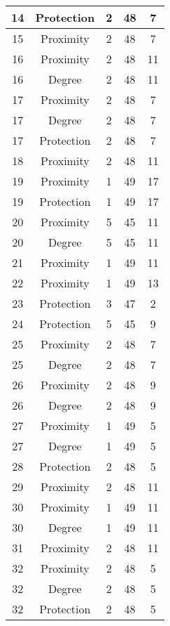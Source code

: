 \documentclass[results.tex]{subfiles}
\begin{document}
\begin{center}
\begin{tabular}{| c || c | c | c | c |}
    \hline
    14 & Protection & 2 & 48 & 7 \\ 
    \hline
    15 & Proximity & 2 & 48 & 7 \\ 
    \hline
    16 & Proximity & 2 & 48 & 11 \\ 
    \hline
    16 & Degree & 2 & 48 & 11 \\ 
    \hline
    17 & Proximity & 2 & 48 & 7 \\ 
    \hline
    17 & Degree & 2 & 48 & 7 \\ 
    \hline
    17 & Protection & 2 & 48 & 7 \\ 
    \hline
    18 & Proximity & 2 & 48 & 11 \\ 
    \hline
    19 & Proximity & 1 & 49 & 17 \\ 
    \hline
    19 & Protection & 1 & 49 & 17 \\ 
    \hline
    20 & Proximity & 5 & 45 & 11 \\ 
    \hline
    20 & Degree & 5 & 45 & 11 \\ 
    \hline
    21 & Proximity & 1 & 49 & 11 \\ 
    \hline
    22 & Proximity & 1 & 49 & 13 \\ 
    \hline
    23 & Protection & 3 & 47 & 2 \\ 
    \hline
    24 & Protection & 5 & 45 & 9 \\ 
    \hline
    25 & Proximity & 2 & 48 & 7 \\ 
    \hline
    25 & Degree & 2 & 48 & 7 \\ 
    \hline
    26 & Proximity & 2 & 48 & 9 \\ 
    \hline
    26 & Degree & 2 & 48 & 9 \\ 
    \hline
    27 & Proximity & 1 & 49 & 5 \\ 
    \hline
    27 & Degree & 1 & 49 & 5 \\ 
    \hline
    28 & Protection & 2 & 48 & 5 \\ 
    \hline
    29 & Proximity & 2 & 48 & 11 \\ 
    \hline
    30 & Proximity & 1 & 49 & 11 \\ 
    \hline
    30 & Degree & 1 & 49 & 11 \\ 
    \hline
    31 & Proximity & 2 & 48 & 11 \\ 
    \hline
    32 & Proximity & 2 & 48 & 5 \\ 
    \hline
    32 & Degree & 2 & 48 & 5 \\ 
    \hline
    32 & Protection & 2 & 48 & 5 \\ 

\end{tabular}
\end{center}
\end{document}
